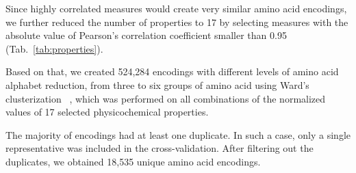 \documentclass[fleqn,10pt,twoside]{gcb15submission}
\begin{document}
  Since highly correlated measures would create very similar amino acid 
encodings, we further reduced the number of properties to 17 by selecting 
measures with the absolute value of Pearson's correlation coefficient smaller 
than 0.95 (Tab.~\ref{tab:properties}). 

  Based on that, we created 524,284 encodings with different levels of 
amino acid alphabet reduction, from three to six groups of amino acid  using Ward's 
clusterization ~\citep{joe_h._ward_jr_hierarchical_1963},  which was performed 
on all combinations of the normalized values of 17 selected physicochemical properties.

  The majority of encodings had at least one duplicate. In such a case, only a 
single representative was included in the cross-validation. After filtering out the 
duplicates, we obtained 18,535 unique amino acid encodings.
\end{document}
